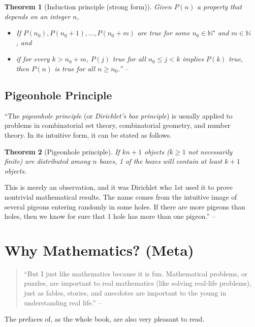 \documentclass[oneside]{book}
\numberwithin{equation}{section}
\newtheorem{theorem}{Theorem}[section]
\begin{document}
\begin{theorem}[Induction principle (strong form)]
	Given $P(n)$ a property that depends on an integer $n$,
	\begin{itemize}
		\item[(i)] If $P(n_0),P(n_0 + 1),\ldots,P(n_0 + m)$ are true for some $n_0\in\mathbb{N}^\star$ and $m\in\mathbb{N}$, and
		\item[(ii)] if for every $k > n_0 + m$, $P(j)$ true for all $n_0\le j < k$ implies $P(k)$ true, then $P(n)$ is true for all $n\ge n_0$.'' -- \cite[p. 7]{Gelca_Andreescu2017}
	\end{itemize}
\end{theorem}

\subsection{Pigeonhole Principle}
``The \textit{pigeonhole principle} (or \textit{Dirichlet's box principle}) is usually applied to problems in combinatorial set theory, combinatorial geometry, and number theory. In its intuitive form, it can be stated as follows.

\begin{theorem}[Pigeonhole principle]
	If $kn + 1$ objects ($k\ge 1$ not necessarily finite) are distributed among $n$ boxes, 1 of the boxes will contain at least $k + 1$ objects.
\end{theorem}
This is merely an observation, and it was Dirichlet who 1st used it to prove nontrivial mathematical results. The name comes from the intuitive image of several pigeons entering randomly in some holes. If there are more pigeons than holes, then we know for sure that 1 hole has more than one pigeon.'' -- \cite[Sect. 1.3, p. 11]{Gelca_Andreescu2017}

\section{Why Mathematics? (Meta)}
\begin{quotation}
	``But I just like mathematics because it is fun. Mathematical problems, or puzzles, are important to real mathematics (like solving real-life problems), just as fables, stories, and anecdotes are important to the young in understanding real life.'' -- \cite[Preface, p. viii]{Tao2006}
\end{quotation}
The prefaces of, as the whole book, \cite{Tao2006} are also very pleasant to read.

\end{document}
